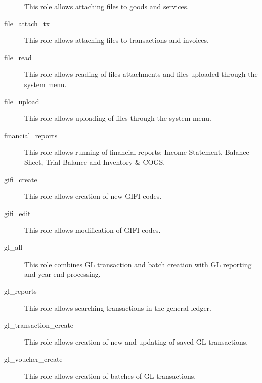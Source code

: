 \begin{description}
                         This role allows attaching files to goods and services.
\item [file\_attach\_tx] \htmlspacing 
                         This role allows attaching files to transactions and invoices.
\item [file\_read] \htmlspacing 
                         This role allows reading of files attachments and files uploaded through the system menu.
\item [file\_upload] \htmlspacing 
                         This role allows uploading of files through the system menu.
\item [financial\_reports] \htmlspacing 
                         This role allows running of financial reports:
                         Income Statement, Balance Sheet, Trial Balance and
                         Inventory \& COGS.
\item [gifi\_create] \htmlspacing 
                         This role allows creation of new GIFI codes.
\item [gifi\_edit] \htmlspacing 
                         This role allows modification of GIFI codes.
\item [gl\_all] \htmlspacing 
                         This role combines \gls{GL}  transaction and batch creation
                         with \gls{GL}  reporting and year-end processing.
\item [gl\_reports] \htmlspacing 
                         This role allows searching transactions in the general ledger.
\item [gl\_transaction\_create] \htmlspacing 
                         This role allows creation of new and updating of saved \gls{GL}  transactions.
\item [gl\_voucher\_create] \htmlspacing 
                         This role allows creation of batches of \gls{GL}  transactions.

\end{description}
